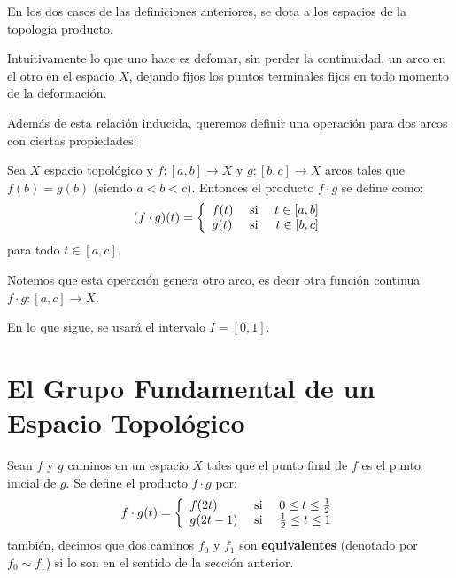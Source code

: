 \documentclass[12pt]{report}
\theoremstyle{largebreak}
\newcommand\cf[3]{\ensuremath{#1:#2\rightarrow#3}}
\begin{document}
    \begin{obs}
        En los dos casos de las definiciones anteriores, se dota a los espacios de la topología producto.
    \end{obs}

    Intuitivamente lo que uno hace es defomar, sin perder la continuidad, un arco en el otro en el espacio $X$, dejando fijos los puntos terminales fijos en todo momento de la deformación.

    Además de esta relación inducida, queremos definir una operación para dos arcos con ciertas propiedades:

    \begin{mydef}
        Sea $X$ espacio topológico y $\cf{f}{[a,b]}{X}$ y $\cf{g}{[b,c]}{X}$ arcos tales que $f(b)=g(b)$ (siendo $a<b<c$). Entonces el producto $f\cdot g$ se define como:
        \begin{equation*}
            (f\cdot g)(t)=\left\{
                \begin{array}{lcr}
                    f(t) & \textup{ si } & t\in[a,b]\\
                    g(t) & \textup{ si } & t\in[b,c]\\
                \end{array}
            \right.
        \end{equation*}
        para todo $t\in[a,c]$.
    \end{mydef}

    \begin{obs}
        Notemos que esta operación genera otro arco, es decir otra función continua $\cf{f\cdot g}{[a,c]}{X}$.
    \end{obs}

    En lo que sigue, se usará el intervalo $I=[0,1]$.

    \section{El Grupo Fundamental de un Espacio Topológico}

    \begin{mydef}
        Sean $f$ y $g$ caminos en un espacio $X$ tales que el punto final de $f$ es el punto inicial de $g$. Se define el producto $f\cdot g$ por:
        \begin{equation*}
            f\cdot g(t)=\left\{
                \begin{array}{lcr}
                    f(2t) & \textup{ si } & 0\leq t\leq\frac{1}{2}\\
                    g(2t-1) & \textup{ si } & \frac{1}{2}\leq t\leq1\\
                \end{array}
            \right.
        \end{equation*}
        también, decimos que dos caminos $f_0$ y $f_1$ son \textbf{equivalentes} (denotado por $f_0\sim f_1$) si lo son en el sentido de la sección anterior.
    \end{mydef}
\end{document}
